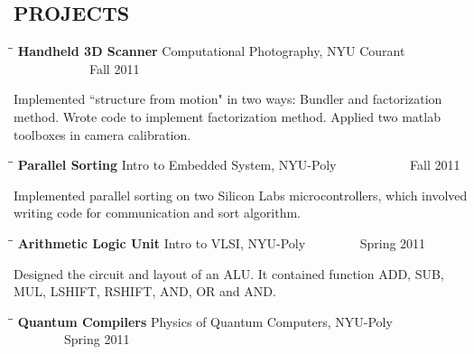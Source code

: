 \documentclass{res}
\begin{document}
\begin{resume}
\section{PROJECTS}
   \vspace{-0.1in}	
   \begin{tabbing}
   \hspace{2.3in}\= \hspace{2.6in}\= \kill %
    {\bf Handheld 3D Scanner} \>Computational Photography, NYU Courant\> ~~~~~~~~~~~~Fall 2011\\
   \end{tabbing}\vspace{-20pt}
    Implemented ``structure from motion" in two ways: Bundler and factorization method. Wrote code to implement factorization method. Applied two matlab toolboxes in camera calibration. \\ 
       \begin{tabbing}
   \hspace{2.3in}\= \hspace{2.6in}\= \kill %
    {\bf Parallel Sorting} \>Intro to Embedded System, NYU-Poly     \>~~~~~~~~~~~Fall 2011 \\
     \end{tabbing}\vspace{-20pt}      %
     Implemented parallel sorting on two Silicon Labs microcontrollers, which involved writing code for communication and sort algorithm.
   \begin{tabbing}%
   \hspace{2.3in}\= \hspace{2.6in}\= \kill %
   {\bf Arithmetic Logic Unit}  \>Intro to VLSI, NYU-Poly\> ~~~~~~~~Spring 2011\\
   \end{tabbing}\vspace{-20pt}
    Designed the circuit and layout of an ALU. It contained function ADD, SUB, MUL, LSHIFT, RSHIFT, AND, OR and AND. 
      \begin{tabbing}%
   \hspace{2.3in}\= \hspace{2.6in}\= \kill %
   {\bf Quantum Compilers}  \>Physics of Quantum Computers, NYU-Poly\> ~~~~~~~~Spring 2011\\
   \end{tabbing}\vspace{-20pt}

\end{resume}
\end{document}
